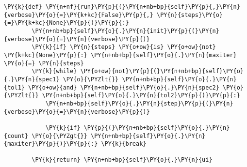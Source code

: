 \begin{tcolorbox}[breakable, size=fbox, boxrule=1pt, pad at break*=1mm,colback=cellbackground, colframe=cellborder]
\begin{Verbatim}[commandchars=\\\{\}]
    \PY{k}{def} \PY{n+nf}{run}\PY{p}{(}\PY{n+nb+bp}{self}\PY{p}{,}\PY{n}{verbose}\PY{o}{=}\PY{k+kc}{False}\PY{p}{,} \PY{n}{steps}\PY{o}{=}\PY{k+kc}{None}\PY{p}{)}\PY{p}{:}
        \PY{n+nb+bp}{self}\PY{o}{.}\PY{n}{init}\PY{p}{(}\PY{n}{verbose}\PY{o}{=}\PY{n}{verbose}\PY{p}{)}
        \PY{k}{if} \PY{n}{steps} \PY{o+ow}{is} \PY{o+ow}{not} \PY{k+kc}{None}\PY{p}{:} \PY{n+nb+bp}{self}\PY{o}{.}\PY{n}{maxiter} \PY{o}{=} \PY{n}{steps}
        \PY{k}{while} \PY{o+ow}{not}\PY{p}{(}\PY{n+nb+bp}{self}\PY{o}{.}\PY{n}{spec1} \PY{o}{\PYZlt{}} \PY{n+nb+bp}{self}\PY{o}{.}\PY{n}{tol1} \PY{o+ow}{and} \PY{n+nb+bp}{self}\PY{o}{.}\PY{n}{spec2} \PY{o}{\PYZlt{}} \PY{n+nb+bp}{self}\PY{o}{.}\PY{n}{tol2}\PY{p}{)}\PY{p}{:}
            \PY{n+nb+bp}{self}\PY{o}{.}\PY{n}{step}\PY{p}{(}\PY{n}{verbose}\PY{o}{=}\PY{n}{verbose}\PY{p}{)}

            \PY{k}{if} \PY{p}{(}\PY{n+nb+bp}{self}\PY{o}{.}\PY{n}{count} \PY{o}{\PYZgt{}} \PY{n+nb+bp}{self}\PY{o}{.}\PY{n}{maxiter}\PY{p}{)}\PY{p}{:} \PY{k}{break}

        \PY{k}{return} \PY{n+nb+bp}{self}\PY{o}{.}\PY{n}{ui}
\end{Verbatim}
\end{tcolorbox}


    
    
    
% 
